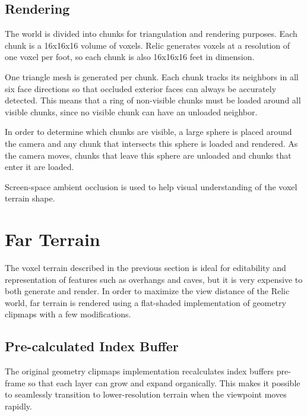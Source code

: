 \subsection{Rendering}

The world is divided into chunks for triangulation and rendering purposes.
Each chunk is a 16x16x16 volume of voxels.
Relic generates voxels at a resolution of one voxel per foot, so each chunk is also 16x16x16 feet in dimension.

One triangle mesh is generated per chunk.
Each chunk tracks its neighbors in all six face directions so that occluded exterior faces can always be accurately detected.
This means that a ring of non-visible chunks must be loaded around all visible chunks, since no visible chunk can have an unloaded neighbor.

In order to determine which chunks are visible, a large sphere is placed around the camera and any chunk that intersects this sphere is loaded and rendered.
As the camera moves, chunks that leave this sphere are unloaded and chunks that enter it are loaded.

Screen-space ambient occlusion is used to help visual understanding of the voxel terrain shape.


\section{Far Terrain} \label{clipterrain} %

The voxel terrain described in the previous section is ideal for editability and representation of features such as overhangs and caves, but it is very expensive to both generate and render.
In order to maximize the view distance of the Relic world, far terrain is rendered using a flat-shaded implementation of geometry clipmaps with a few modifications.

\subsection{Pre-calculated Index Buffer}

The original geometry clipmaps implementation recalculates index buffers pre-frame so that each layer can grow and expand organically.
This makes it possible to seamlessly transition to lower-resolution terrain when the viewpoint moves rapidly.

